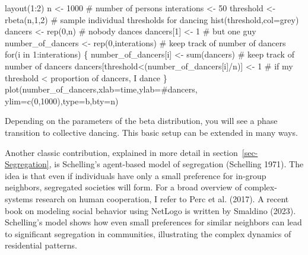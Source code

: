 \documentclass[
  a4paper,
  DIV=11,
  numbers=noendperiod,
  oneside]{scrreprt}
\newenvironment{Shaded}{}{}
\newcommand{\AttributeTok}[1]{\textcolor[rgb]{0.84,0.23,0.29}{#1}}
\newcommand{\CommentTok}[1]{\textcolor[rgb]{0.42,0.45,0.49}{#1}}
\newcommand{\ControlFlowTok}[1]{\textcolor[rgb]{0.84,0.23,0.29}{#1}}
\newcommand{\DecValTok}[1]{\textcolor[rgb]{0.00,0.36,0.77}{#1}}
\newcommand{\FunctionTok}[1]{\textcolor[rgb]{0.44,0.26,0.76}{#1}}
\newcommand{\NormalTok}[1]{\textcolor[rgb]{0.14,0.16,0.18}{#1}}
\newcommand{\OtherTok}[1]{\textcolor[rgb]{0.44,0.26,0.76}{#1}}
\newcommand{\SpecialCharTok}[1]{\textcolor[rgb]{0.00,0.36,0.77}{#1}}
\newcommand{\StringTok}[1]{\textcolor[rgb]{0.01,0.18,0.38}{#1}}
\begin{document}
\begin{Shaded}
\begin{Highlighting}[]
\FunctionTok{layout}\NormalTok{(}\DecValTok{1}\SpecialCharTok{:}\DecValTok{2}\NormalTok{)}
\NormalTok{n }\OtherTok{\textless{}{-}} \DecValTok{1000} \CommentTok{\# number of persons}
\NormalTok{interations }\OtherTok{\textless{}{-}} \DecValTok{50}
\NormalTok{threshold }\OtherTok{\textless{}{-}} \FunctionTok{rbeta}\NormalTok{(n,}\DecValTok{1}\NormalTok{,}\DecValTok{2}\NormalTok{) }\CommentTok{\# sample individual thresholds for dancing}
\FunctionTok{hist}\NormalTok{(threshold,}\AttributeTok{col=}\StringTok{\textquotesingle{}grey\textquotesingle{}}\NormalTok{)}
\NormalTok{dancers }\OtherTok{\textless{}{-}} \FunctionTok{rep}\NormalTok{(}\DecValTok{0}\NormalTok{,n) }\CommentTok{\# nobody dances}
\NormalTok{dancers[}\DecValTok{1}\NormalTok{] }\OtherTok{\textless{}{-}} \DecValTok{1} \CommentTok{\# but one guy}
\NormalTok{number\_of\_dancers }\OtherTok{\textless{}{-}} \FunctionTok{rep}\NormalTok{(}\DecValTok{0}\NormalTok{,interations) }\CommentTok{\# keep track of number of dancers}
\ControlFlowTok{for}\NormalTok{(i }\ControlFlowTok{in} \DecValTok{1}\SpecialCharTok{:}\NormalTok{interations)}
\NormalTok{\{}
\NormalTok{  number\_of\_dancers[i] }\OtherTok{\textless{}{-}} \FunctionTok{sum}\NormalTok{(dancers) }\CommentTok{\# keep track of number of dancers}
\NormalTok{  dancers[threshold}\SpecialCharTok{\textless{}}\NormalTok{(number\_of\_dancers[i]}\SpecialCharTok{/}\NormalTok{n)] }\OtherTok{\textless{}{-}} \DecValTok{1} 
\CommentTok{\# if my threshold \textless{} proportion of dancers, I dance}
\NormalTok{\}}
\FunctionTok{plot}\NormalTok{(number\_of\_dancers,}\AttributeTok{xlab=}\StringTok{\textquotesingle{}time\textquotesingle{}}\NormalTok{,}\AttributeTok{ylab=}\StringTok{\textquotesingle{}\#dancers\textquotesingle{}}\NormalTok{,}
     \AttributeTok{ylim=}\FunctionTok{c}\NormalTok{(}\DecValTok{0}\NormalTok{,}\DecValTok{1000}\NormalTok{),}\AttributeTok{type=}\StringTok{\textquotesingle{}b\textquotesingle{}}\NormalTok{,}\AttributeTok{bty=}\StringTok{\textquotesingle{}n\textquotesingle{}}\NormalTok{)}
\end{Highlighting}
\end{Shaded}

Depending on the parameters of the beta distribution, you will see a
phase transition to collective dancing. This basic setup can be extended
in many ways.

Another classic contribution, explained in more detail in
section~\ref{sec-Segregation}, is Schelling's agent-based model of
segregation (Schelling 1971). The idea is that even if individuals have
only a small preference for in-group neighbors, segregated societies
will form. For a broad overview of complex-systems research on human
cooperation, I refer to Perc et al. (2017). A recent book on modeling
social behavior using NetLogo is written by Smaldino (2023). Schelling's
model shows how even small preferences for similar neighbors can lead to
significant segregation in communities, illustrating the complex
dynamics of residential patterns.
\end{document}
